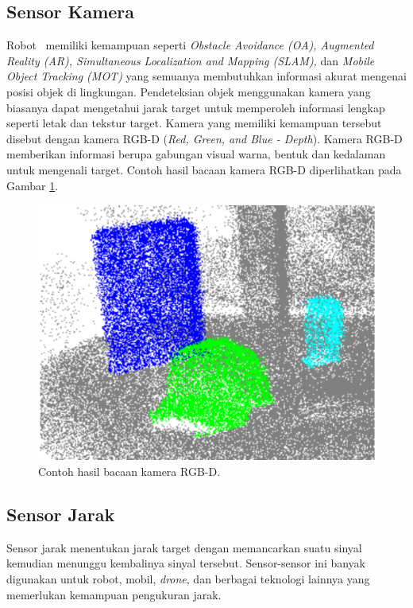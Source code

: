   \subsection{Sensor Kamera}
    \label{subsec:Sub-Metode_Kamera}
    
    Robot \auto\ memiliki kemampuan seperti \textit{Obstacle Avoidance (OA), Augmented Reality (AR), Simultaneous Localization and Mapping (SLAM),} dan \textit{Mobile Object Tracking (MOT)} yang semuanya membutuhkan informasi akurat mengenai posisi objek di lingkungan. Pendeteksian objek menggunakan kamera yang biasanya dapat mengetahui jarak target untuk memperoleh informasi lengkap seperti letak dan tekstur target. Kamera yang memiliki kemampuan tersebut disebut dengan kamera RGB-D (\textit{Red, Green, and Blue - Depth}). Kamera RGB-D memberikan informasi berupa gabungan visual warna, bentuk dan kedalaman untuk mengenali target\cite{b3}. Contoh hasil bacaan kamera RGB-D diperlihatkan pada Gambar \ref{fig:Ch02_rgbd_kamera}.
    \begin{figure}[!ht]
        \centering
        \includegraphics[scale=0.3]{rgbd.png}
        \caption{Contoh hasil bacaan kamera RGB-D\cite{b3}.}
        \label{fig:Ch02_rgbd_kamera}
    \end{figure}
    
    \subsection{Sensor Jarak}
    \label{subsec:Sub-Metode_Laser}
    
    Sensor jarak menentukan jarak target dengan memancarkan suatu sinyal kemudian menunggu kembalinya sinyal tersebut. Sensor-sensor ini banyak digunakan untuk robot, mobil, \textit{drone}, dan berbagai teknologi lainnya yang memerlukan kemampuan pengukuran jarak.
    
